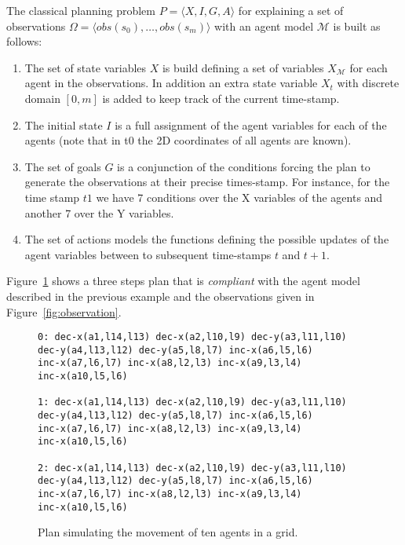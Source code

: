 \documentclass[letterpaper]{article} %
\newcommand{\tup}[1]{{\langle #1 \rangle}}
\begin{document}
The classical planning problem $P=\tup{X,I,G,A}$ for explaining a set of observations $\Omega=\tup{obs(s_0), \ldots, obs(s_m)}$ with an agent model $\mathcal{M}$ is built as follows:
\begin{enumerate}
\item The set of state variables $X$ is build defining a set of variables $X_\mathcal{M}$ for each agent in the observations. In addition an extra state variable $X_t$ with discrete domain $[0,m]$ is added to keep track of the current time-stamp.
\item The initial state $I$ is a full assignment of the agent variables for each of the agents (note that in t0 the 2D coordinates of all agents are known).
\item The set of goals $G$ is a conjunction of the conditions forcing the plan to generate the observations at their precise times-stamp. For instance, for the time stamp $t1$ we have 7 conditions over the X variables of the agents and another 7 over the Y variables.
\item The set of actions models the functions defining the possible updates of the agent variables between to subsequent time-stamps $t$ and $t+1$. 
\end{enumerate}

Figure~\ref{fig:plan} shows a three steps plan that is {\em compliant} with the agent model described in the previous example and the observations given in Figure~\ref{fig:observation}.


\begin{figure}
\begin{scriptsize}
\begin{verbatim}
0: dec-x(a1,l14,l13) dec-x(a2,l10,l9) dec-y(a3,l11,l10) 
dec-y(a4,l13,l12) dec-y(a5,l8,l7) inc-x(a6,l5,l6) 
inc-x(a7,l6,l7) inc-x(a8,l2,l3) inc-x(a9,l3,l4) 
inc-x(a10,l5,l6) 

1: dec-x(a1,l14,l13) dec-x(a2,l10,l9) dec-y(a3,l11,l10) 
dec-y(a4,l13,l12) dec-y(a5,l8,l7) inc-x(a6,l5,l6) 
inc-x(a7,l6,l7) inc-x(a8,l2,l3) inc-x(a9,l3,l4) 
inc-x(a10,l5,l6) 

2: dec-x(a1,l14,l13) dec-x(a2,l10,l9) dec-y(a3,l11,l10) 
dec-y(a4,l13,l12) dec-y(a5,l8,l7) inc-x(a6,l5,l6) 
inc-x(a7,l6,l7) inc-x(a8,l2,l3) inc-x(a9,l3,l4) 
inc-x(a10,l5,l6) 
\end{verbatim}
\end{scriptsize}
 \caption{\small Plan simulating the movement of ten agents in a grid.}
\label{fig:plan}
\end{figure}
\end{document}
